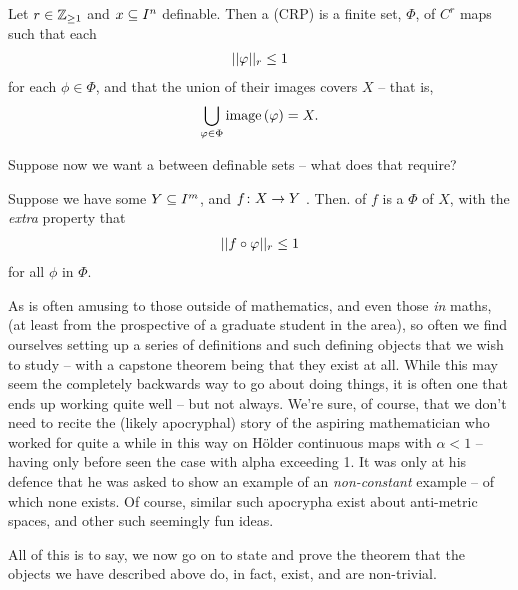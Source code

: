 \begin{definition}
  Let $r \in \Zgeq{1}$ and $\CIn[x]{n}$ definable. Then a \emph{\cellrparam} (CRP) is a finite set, $\Phi$, of  $C^r$ \cellr maps such that each
    \begin{align*}
      \rnorm[r]{\phi} \leq 1
    \end{align*}
  for each $\phi \in \Phi$, and that the union of their images covers $X$ -- that is,
    \begin{align*}
      \bigcup_{\phi \in \Phi} \image{\phi} = X.
    \end{align*}
\end{definition}
Suppose now we want a \cellrparam between definable sets -- what does that require?
\begin{definition}
  Suppose we have some $\CIn[Y]{m}$, and $\funcdom{f}{X}{Y}$ . Then. \cellrparam[r] of $f$ is a \cellrparam[r] $\Phi$ of $X$, with the \emph{extra} property that
    \begin{align*}
      \rnorm[r]{f \circ \phi} \leq 1
    \end{align*}
    for all $\phi$ in $\Phi$.
\end{definition}

As is often amusing to those outside of mathematics, and even those \emph{in} maths, (at least from the prospective of a graduate student in the area), so often we find ourselves setting up a series of definitions and such defining objects that we wish to study -- with a capstone theorem being that they exist at all. While this may seem the completely backwards way to go about doing things, it is often one that ends up working quite well -- but not always. We're sure, of course, that we don't need to recite the (likely apocryphal) story of the aspiring mathematician who worked for quite a while in this way on H\"older continuous maps with $\alpha < 1$ -- having only before seen the case with alpha exceeding 1. It was only at his defence that he was asked to show an example of an \emph{non-constant} example -- of which none exists. Of course, similar such apocrypha exist about anti-metric spaces, and other such seemingly fun ideas.

All of this is to say, we now go on to state and prove the theorem that the objects we have described above do, in fact, exist, and are non-trivial.

